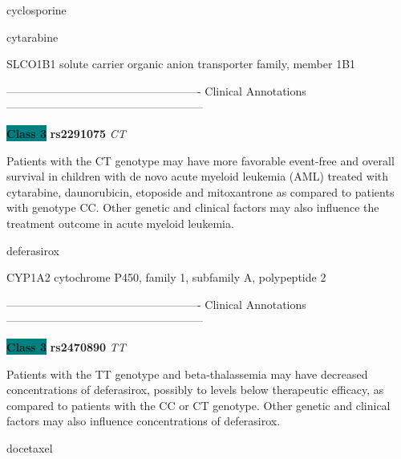 \documentclass{resume} %
\begin{document}
\begin{rSection}{ cyclosporine }
\end{rSection}\begin{rSection}{ cytarabine }
\item[]

\begin{rSubsection}{ SLCO1B1 }{ solute carrier organic anion transporter family, member 1B1 }{}{}
\item[]

\item[] ---------------------------------------------------- Clinical Annotations -----------------------------------------------------\newline
\item \textbf{\colorbox{teal} {Class 3}} \textbf{ rs2291075 } \textit{ CT }
\item[] Patients with the CT genotype may have more favorable event-free and overall survival in children with de novo acute myeloid leukemia (AML) treated with cytarabine, daunorubicin, etoposide and mitoxantrone as compared to patients with genotype CC. Other genetic and clinical factors may also influence the treatment outcome in acute myeloid leukemia.
\end{rSubsection}

\end{rSection}\begin{rSection}{ deferasirox }
\item[]

\begin{rSubsection}{ CYP1A2 }{ cytochrome P450, family 1, subfamily A, polypeptide 2 }{}{}
\item[]

\item[] ---------------------------------------------------- Clinical Annotations -----------------------------------------------------\newline
\item \textbf{\colorbox{teal} {Class 3}} \textbf{ rs2470890 } \textit{ TT }
\item[] Patients with the TT genotype and beta-thalassemia may have decreased concentrations of deferasirox, possibly to levels below therapeutic efficacy, as compared to patients with the CC or CT genotype. Other genetic and clinical factors may also influence concentrations of deferasirox.
\end{rSubsection}

\end{rSection}\begin{rSection}{ docetaxel }
\item[]


\end{rSection}
\end{document}
